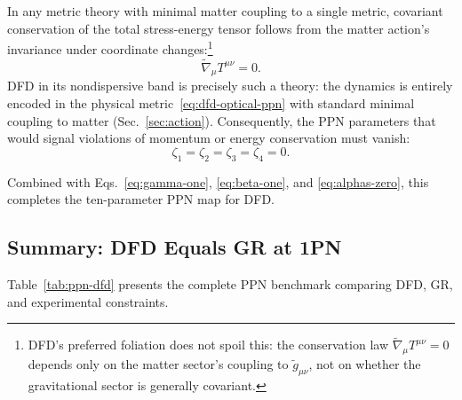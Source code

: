 In any metric theory with minimal matter coupling to a single metric, covariant conservation of the total stress-energy tensor follows from the matter action's invariance under coordinate changes:\footnote{DFD's preferred foliation does not spoil this: the conservation law $\tilde{\nabla}_\mu T^{\mu\nu}=0$ depends only on the matter sector's coupling to $\tilde{g}_{\mu\nu}$, not on whether the gravitational sector is generally covariant.}
\begin{equation}
\tilde{\nabla}_{\mu} T^{\mu\nu} = 0.
\end{equation}
DFD in its nondispersive band is precisely such a theory: the dynamics is entirely encoded in the physical metric~\eqref{eq:dfd-optical-ppn} with standard minimal coupling to matter (Sec.~\ref{sec:action}). Consequently, the PPN parameters that would signal violations of momentum or energy conservation must vanish:
\begin{equation}\label{eq:zetas-zero}
\boxed{\zeta_1 = \zeta_2 = \zeta_3 = \zeta_4 = 0}.
\end{equation}

Combined with Eqs.~\eqref{eq:gamma-one}, \eqref{eq:beta-one}, and \eqref{eq:alphas-zero}, this completes the ten-parameter PPN map for DFD.

\subsection{Summary: DFD Equals GR at 1PN}\label{sec:ppn-summary}

Table~\ref{tab:ppn-dfd} presents the complete PPN benchmark comparing DFD, GR, and experimental constraints.

